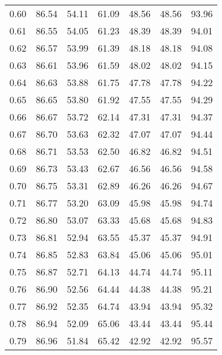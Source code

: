 \begin{tabular}{|c|c|c|c|c|c|c|}
      0.60 &     86.54 &     54.11 &      61.09 &   48.56 &      48.56 &         93.96 \\
      0.61 &     86.55 &     54.05 &      61.23 &   48.39 &      48.39 &         94.01 \\
      0.62 &     86.57 &     53.99 &      61.39 &   48.18 &      48.18 &         94.08 \\
      0.63 &     86.61 &     53.96 &      61.59 &   48.02 &      48.02 &         94.15 \\
      0.64 &     86.63 &     53.88 &      61.75 &   47.78 &      47.78 &         94.22 \\
      0.65 &     86.65 &     53.80 &      61.92 &   47.55 &      47.55 &         94.29 \\
      0.66 &     86.67 &     53.72 &      62.14 &   47.31 &      47.31 &         94.37 \\
      0.67 &     86.70 &     53.63 &      62.32 &   47.07 &      47.07 &         94.44 \\
      0.68 &     86.71 &     53.53 &      62.50 &   46.82 &      46.82 &         94.51 \\
      0.69 &     86.73 &     53.43 &      62.67 &   46.56 &      46.56 &         94.58 \\
      0.70 &     86.75 &     53.31 &      62.89 &   46.26 &      46.26 &         94.67 \\
      0.71 &     86.77 &     53.20 &      63.09 &   45.98 &      45.98 &         94.74 \\
      0.72 &     86.80 &     53.07 &      63.33 &   45.68 &      45.68 &         94.83 \\
      0.73 &     86.81 &     52.94 &      63.55 &   45.37 &      45.37 &         94.91 \\
      0.74 &     86.85 &     52.83 &      63.84 &   45.06 &      45.06 &         95.01 \\
      0.75 &     86.87 &     52.71 &      64.13 &   44.74 &      44.74 &         95.11 \\
      0.76 &     86.90 &     52.56 &      64.44 &   44.38 &      44.38 &         95.21 \\
      0.77 &     86.92 &     52.35 &      64.74 &   43.94 &      43.94 &         95.32 \\
      0.78 &     86.94 &     52.09 &      65.06 &   43.44 &      43.44 &         95.44 \\
      0.79 &     86.96 &     51.84 &      65.42 &   42.92 &      42.92 &         95.57 \\

\end{tabular}
